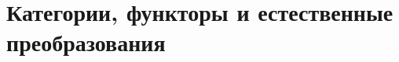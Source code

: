 \documentclass[document]{subfiles}
\begin{document}
\chapter{Категории, функторы и естественные преобразования}
\end{document}
